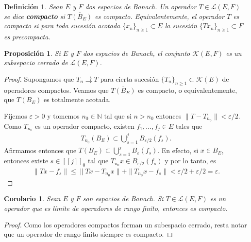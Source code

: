 \documentclass[11pt]{report}
\theoremstyle{colored}
\newtheorem{definition}{Definición}[section]
\newtheorem{proposition}{Proposición}[section]
\newtheorem{corollary}{Corolario}[section]
\newcommand{\N}{\mathbb{N}}
\newcommand{\eps}{\varepsilon}
\newcommand{\nat}[1]{[\![#1]\!]}
\newcommand{\natzero}[1]{\nat{#1}_0}
\begin{document}
\begin{definition} Sean $E$ y $F$ dos espacios de Banach. Un operador $T \in \mathscr{L}(E,F)$ se dice \textbf{compacto} si $\overline{T(B_E)}$ es compacto. Equivalentemente, el operador $T$ es compacto si para toda sucesión acotada $\{x_n\}_{n \geq 1} \subset E$ la sucesión $\{Tx_n\}_{n \geq 1} \subset F$ es precompacta.
\end{definition}

\begin{proposition} Si $E$ y $F$ dos espacios de Banach, el conjunto $\mathscr{K}(E,F)$ es un subsepacio cerrado de $\mathscr{L}(E,F)$.
\end{proposition}
\begin{proof} Supongamos que $T_{n} \rightrightarrows T$ para cierta sucesión $\{T_n\}_{n \geq 1} \subset \mathscr{K}(E)$ de operadores compactos. Veamos que $\overline{T(B_E)}$ es compacto, o equivalentemente, que $T(B_E)$ es totalmente acotada.

Fijemos $\eps > 0$ y tomemos $n_0 \in \N$ tal que si $n > n_0$ entonces $\|T-T_{n_0}\| < \eps/2$. Como $T_{n_0}$ es un operador compacto, existen $f_1, \dots, f_j \in E$ tales que
\begin{align*}
T_{n_0}(B_E) \subset \bigcup_{s=1}^{j}B_{\eps/2}(f_s).
\end{align*}
Afirmamos entonces que $T(B_E) \subset \bigcup_{s=1}^{j}B_{\eps}(f_s)$. En efecto, si $x \in B_E$, entonces existe $s \in \natzero{j}$ tal que $T_{n_0}x \in B_{\eps/2}(f_s)$ y por lo tanto, es
\begin{align*}
\|Tx-f_s\| \leq \|Tx-T_{n_0}x\| + \|T_{n_0}x - f_s\| < \eps/2 + \eps/2 = \eps.
\end{align*}
\end{proof}

\begin{corollary} Sean $E$ y $F$ son espacios de Banach. Si $T \in \mathscr{L}(E,F)$ es un operador que es límite de operadores de rango finito, entonces es compacto.
\end{corollary}
\begin{proof} Como los operadores compactos forman un subespacio cerrado, resta notar que un operador de rango finito siempre es compacto.
\end{proof}
\end{document}
